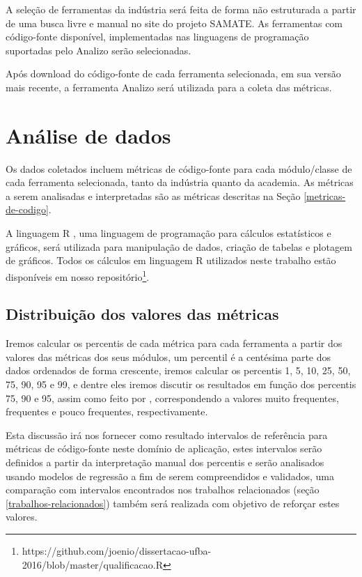A seleção de ferramentas da indústria será feita de forma não estruturada a
partir de uma busca livre e manual no site do projeto SAMATE. As ferramentas
com código-fonte disponível, implementadas nas linguagens de programação
suportadas pelo Analizo serão selecionadas.

Após download do código-fonte de cada ferramenta selecionada, em sua versão
mais recente, a ferramenta Analizo será utilizada para a coleta das métricas. 

\section{Análise de dados} \label{analise}

Os dados coletados incluem métricas de código-fonte para cada módulo/classe de
cada ferramenta selecionada, tanto da indústria quanto da academia. As
métricas a serem analisadas e interpretadas são as métricas descritas na Seção
\ref{metricas-de-codigo}.

A linguagem R \cite{Ihaka1996}, uma linguagem de programação para cálculos
estatísticos e gráficos, será utilizada para manipulação de dados, criação de
tabelas e plotagem de gráficos. Todos os cálculos em linguagem R utilizados
neste trabalho estão disponíveis
em nosso repositório\footnote{https://github.com/joenio/dissertacao-ufba-2016/blob/master/qualificacao.R}.

\subsection{Distribuição dos valores das métricas}

Iremos calcular os percentis de cada métrica para cada ferramenta a partir dos
valores das métricas dos seus módulos, um percentil é a centésima parte dos
dados ordenados de forma crescente, iremos calcular os percentis 1, 5, 10, 25,
50, 75, 90, 95 e 99, e dentre eles iremos discutir os resultados em função dos
percentis 75, 90 e 95, assim como feito por ,
correspondendo a valores muito frequentes, frequentes e pouco frequentes,
respectivamente.

Esta discussão irá nos fornecer como resultado intervalos de referência para
métricas de código-fonte neste domínio de aplicação, estes intervalos serão
definidos a partir da interpretação manual dos percentis e serão analisados
usando modelos de regressão a fim de serem compreendidos e validados, uma
comparação com intervalos encontrados nos trabalhos relacionados (seção
\ref{trabalhos-relacionados}) também será realizada com objetivo de reforçar
estes valores.

